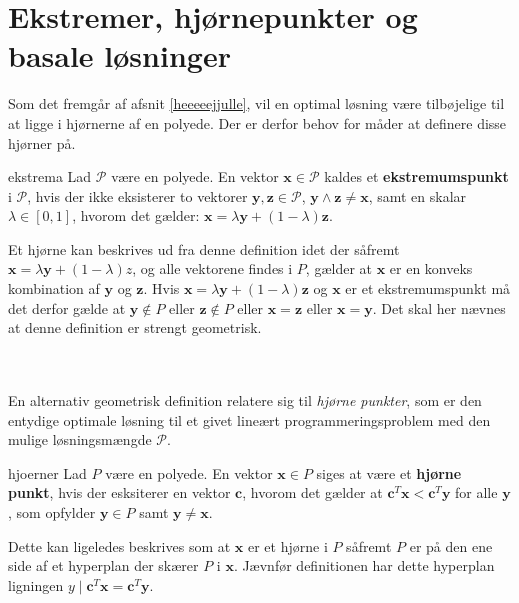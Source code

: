 \section{Ekstremer, hjørnepunkter og basale løsninger}
%
Som det fremgår af afsnit \ref{heeeeejjulle}, vil en optimal løsning være tilbøjelige til at ligge i hjørnerne af en polyede.
Der er derfor behov for måder at definere disse hjørner på.
%
\begin{defn}{}{ekstrema}
Lad $\mathcal{P}$ være en polyede. 
En vektor $\mathbf{x} \in \mathcal{P}$ kaldes et \textbf{ekstremumspunkt} i $\mathcal{P}$, hvis der ikke eksisterer to vektorer $\mathbf{y},\mathbf{z} \in \mathcal{P}$, $\mathbf{y} \land \mathbf{z} \neq \mathbf{x}$, 
samt en skalar $\lambda \in [0,1]$, hvorom det gælder: $\mathbf{x}=\lambda\mathbf{y}+(1-\lambda)\textbf{z}$.
\end{defn}
\noindent
%
%
Et hjørne kan beskrives ud fra denne definition idet der såfremt $\mathbf{x}=\lambda\mathbf{y}+(1-\lambda)z$, og alle vektorene findes i $P$, gælder at $\mathbf{x}$ er en konveks kombination af $\mathbf{y}$ og $\mathbf{z}$.
Hvis $\mathbf{x}=\lambda\mathbf{y}+(1-\lambda)\textbf{z}$ og $\mathbf{x}$ er et ekstremumspunkt må det derfor gælde at $\mathbf{y}\notin P$ eller $\mathbf{z}\notin P$ eller $\mathbf{x}=\mathbf{z}$ eller $\mathbf{x}=\mathbf{y}$. 
Det skal her nævnes at denne definition er strengt geometrisk.
%

\\\\
%
En alternativ geometrisk definition relatere sig til \textit{hjørne punkter}, som er den entydige optimale løsning til et givet lineært programmeringsproblem med den mulige løsningsmængde $\mathcal{P}$.
%
\begin{defn}{}{hjoerner}
Lad $P$ være en polyede. 
En vektor $\mathbf{x}\in P$ siges at være et \textbf{hjørne punkt}, hvis der esksiterer en vektor $\mathbf{c}$, hvorom det gælder at $\mathbf{c}^T\mathbf{x}<\mathbf{c}^T\mathbf{y}$ for alle $\mathbf{y}$, som opfylder $\mathbf{y} \in P$ samt $\mathbf{y}\neq\mathbf{x}$.
\end{defn}
\noindent
%
%
Dette kan ligeledes beskrives som at $\mathbf{x}$ er et hjørne i $P$ såfremt $P$ er på den ene side af et hyperplan der skærer $P$ i $\mathbf{x}$. 
Jævnfør definitionen har dette hyperplan ligningen $y \mid \mathbf{c}^T\mathbf{x}=\mathbf{c}^T\mathbf{y}.$